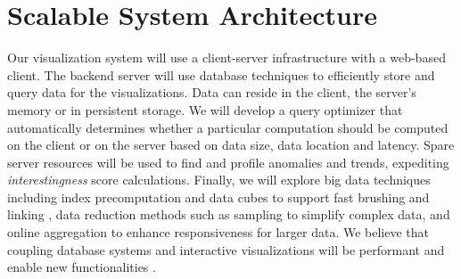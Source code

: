\section*{Scalable System Architecture}

Our visualization system will use a client-server infrastructure with a web-based client. The backend server will use database techniques to efficiently store and query data for the visualizations. Data can reside in the client, the server's memory or in persistent storage.  We will develop a query optimizer that automatically determines whether a particular computation should be computed on the client or on the server based on data size, data location and latency.
Spare server resources will be used to find and profile anomalies and trends, expediting \textit{interestingness} score calculations.
Finally, we will explore big data techniques including index precomputation and data cubes to support fast brushing and linking \cite{liu:immens, lins:nanocubes}, data reduction methods such as sampling to simplify complex data, and online aggregation \cite{hellerstein:onlineagg, agarwal:blinkdb, fisher:trustme} to enhance responsiveness for larger data. We believe that coupling database systems and interactive visualizations will be performant and enable new functionalities \cite{wu:dvms}.

